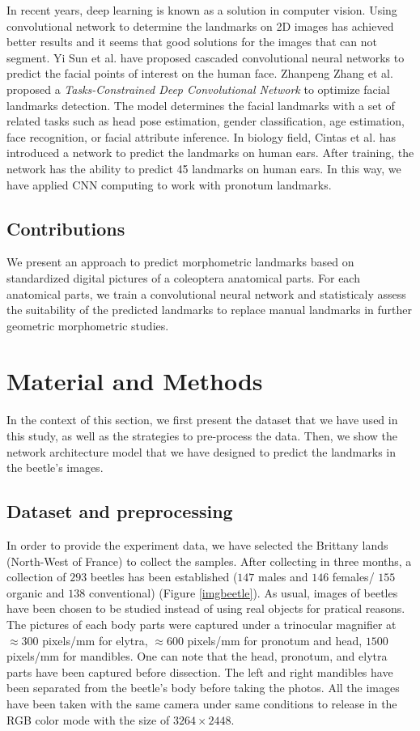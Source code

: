 \documentclass[review]{elsarticle}
\begin{document}
In recent years, deep learning is known as a solution in computer vision. Using convolutional network to determine the landmarks on 2D images has achieved better results and it seems that good solutions for the images that can not segment. Yi Sun et al. \cite{sun2013deep} have proposed cascaded convolutional neural networks to predict the facial points of interest on the human face.
Zhanpeng Zhang et al. \cite{zhang2014facial} proposed a \textit{Tasks-Constrained Deep Convolutional Network} to optimize facial landmarks detection. The model determines the facial landmarks with a set of related tasks such as head pose estimation, gender classification, age estimation, face recognition, or facial attribute inference. In biology field, Cintas et al. \cite{cintas2016automatic} has introduced a network to predict the landmarks on human ears. After training, the network has the ability to predict 45 landmarks on human ears. In this way, we have applied CNN computing to work with pronotum landmarks.

\subsection{Contributions}

We present an approach to predict morphometric landmarks based on standardized digital pictures of a coleoptera anatomical parts. For each anatomical parts, we train a convolutional neural network and statisticaly assess the suitability of the predicted landmarks to replace manual landmarks in further geometric morphometric studies.

\section{Material and Methods}

In the context of this section, we first present the dataset that we have used in this study, as well as the strategies to pre-process the data. Then, we show the network architecture model that we have designed to predict the landmarks in the beetle's images.

\subsection{Dataset and preprocessing}
In order to provide the experiment data, we have selected the Brittany lands (North-West of France) to collect the samples. After collecting in three months, a collection of $293$ beetles has been established ($147$ males and $146$ females/ $155$ organic and $138$ conventional) (Figure \ref{imgbeetle}). As usual, images of beetles have been chosen to be studied instead of using real objects for pratical reasons. The pictures of each body parts were captured under a trinocular magnifier at $\approx 300$ pixels/mm for elytra, $\approx 600$ pixels/mm for pronotum and head, $1500$ pixels/mm for mandibles. One can note that the head, pronotum, and elytra parts have been captured before dissection. The left and right mandibles have been separated from the beetle's body before taking the photos. All the images have been taken with the same camera under same conditions to release in the RGB color mode with the size of $3264 \times 2448$.
\end{document}
